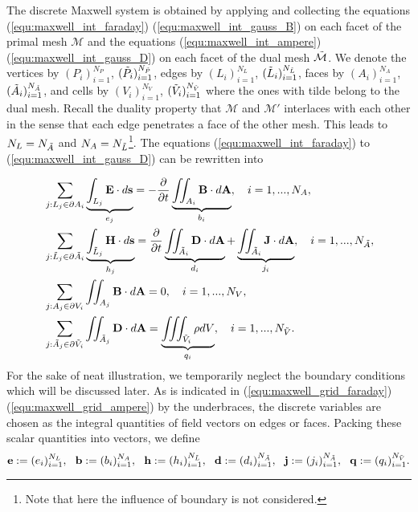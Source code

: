 \documentclass{article}
\begin{document}
The discrete Maxwell system is obtained by applying and collecting the equations (\ref{equ:maxwell_int_faraday}) (\ref{equ:maxwell_int_gauss_B}) on each facet of the primal mesh $\mathcal{M}$ and the equations (\ref{equ:maxwell_int_ampere}) (\ref{equ:maxwell_int_gauss_D}) on each facet of the dual mesh $\Tilde{\mathcal{M}}$. We denote the vertices by $(P_i)_{i=1}^{N_P}$, $(\Tilde{P}_i)_{i=1}^{N_{\Tilde{P}}}$, edges by $(L_i)_{i=1}^{N_L}$, $(\Tilde{L}_i)_{i=1}^{N_{\Tilde{L}}}$, faces by $(A_i)_{i=1}^{N_A}$, $(\Tilde{A}_i)_{i=1}^{N_{\Tilde{A}}}$, and cells by $(V_i)_{i=1}^{N_V}$, $(\Tilde{V}_i)_{i=1}^{N_{\Tilde{V}}}$ where the ones with tilde belong to the dual mesh. Recall the duality property that $\mathcal{M}$ and $\mathcal{M}'$ interlaces with each other in the sense that each edge penetrates a face of the other mesh. This leads to $N_L = N_{\Tilde{A}}$ and $N_A = N_{\Tilde{L}}$\footnote{Note that here the influence of boundary is not considered.}. The equations (\ref{equ:maxwell_int_faraday}) to (\ref{equ:maxwell_int_gauss_D}) can be rewritten into

\begin{align}
    &\sum_{j:L_j\in\partial A_i} \underbrace{\int_{L_j} \mathbf{E} \cdot d\mathbf{s}}_{e_j} = - \frac{\partial}{\partial t} \underbrace{\iint_{A_i} \mathbf{B} \cdot d\mathbf{A}}_{b_i},\ \ \ i = 1,...,N_A, \label{equ:maxwell_grid_faraday} \\
    &\sum_{j:\Tilde{L}_j\in\partial \Tilde{A}_i} \underbrace{\int_{\Tilde{L}_j} \mathbf{H} \cdot d\mathbf{s}}_{h_j} = \frac{\partial}{\partial t} \underbrace{\iint_{\Tilde{A}_i} \mathbf{D} \cdot d\mathbf{A}}_{d_i} + \underbrace{\iint_{\Tilde{A}_i} \mathbf{J} \cdot d\mathbf{A}}_{j_i}, \ \ \ i = 1,...,N_{\Tilde{A}}, \label{equ:maxwell_grid_ampere}\\
    &\sum_{j:A_j\in \partial V_i} \iint_{A_j} \mathbf{B} \cdot d\mathbf{A} = 0,\ \ \ i = 1,..., N_V,\label{equ:maxwell_grid_gauss_B}\\
    &\sum_{j:\Tilde{A}_j \in \partial\Tilde{V}_i}\iint_{\Tilde{A}_j} \mathbf{D} \cdot d\mathbf{A} = \underbrace{\iiint_{\Tilde{V}_i} \rho dV}_{q_i},\ \ \ i = 1,...,N_{\Tilde{V}}. \label{equ:maxwell_grid_gauss_D}
\end{align}
For the sake of neat illustration, we temporarily neglect the boundary conditions which will be discussed later. As is indicated in (\ref{equ:maxwell_grid_faraday})(\ref{equ:maxwell_grid_ampere}) by the underbraces, the discrete variables are chosen as the integral quantities of field vectors on edges or faces. Packing these scalar quantities into vectors, we define
\begin{equation} \label{equ:fit_scale_vector}
    \mathbf{e} := (e_i)_{i=1}^{N_L},\ \ \mathbf{b} := (b_i)_{i=1}^{N_A}, \ \ \mathbf{h} := (h_i)_{i=1}^{N_{\Tilde{L}}}, \ \ \mathbf{d} := (d_i)_{i=1}^{N_{\Tilde{A}}}, \ \ \mathbf{j} := (j_i)_{i=1}^{N_{\Tilde{A}}}, \ \ \mathbf{q} := (q_i)_{i=1}^{N_{\Tilde{V}}}.
\end{equation}
\end{document}
